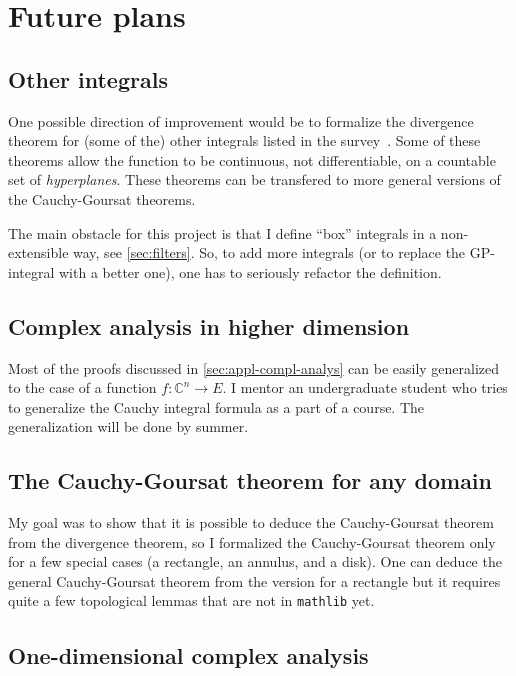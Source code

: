\documentclass[a4paper,UKenglish,cleveref, autoref, thm-restate]{lipics-v2021}
\newcommand{\bbC}{\mathbb{C}}
\begin{document}
\section{Future plans}\label{sec:future-plans}

\subsection{Other integrals}\label{sec:other-integrals}

One possible direction of improvement would be to formalize the
divergence theorem for (some of the) other integrals listed in the
survey~\cite{BONGIORNO2002587}. Some of these theorems allow the
function to be continuous, not differentiable, on a countable set of
\emph{hyperplanes}. These theorems can be transfered to more general
versions of the Cauchy-Goursat theorems.

The main obstacle for this project is that I define \enquote{box}
integrals in a non-extensible way, see \autoref{sec:filters}. So, to
add more integrals (or to replace the GP-integral with a better one),
one has to seriously refactor the definition.

\subsection{Complex analysis in higher dimension}%
\label{sec:compl-analys-high}

Most of the proofs discussed in \autoref{sec:appl-compl-analys} can be
easily generalized to the case of a function
\(f\colon \bbC^{n}\to E\). I mentor an undergraduate student who tries
to generalize the Cauchy integral formula as a part of a course. The
generalization will be done by summer.

\subsection{The Cauchy-Goursat theorem for any domain}\label{sec:cauchy-goursat-any}

My goal was to show that it is possible to deduce the Cauchy-Goursat
theorem from the divergence theorem, so I formalized the
Cauchy-Goursat theorem only for a few special cases (a rectangle, an
annulus, and a disk). One can deduce the general Cauchy-Goursat
theorem from the version for a rectangle but it requires quite a few
topological lemmas that are not in \texttt{mathlib} yet.

\subsection{One-dimensional complex analysis}%
\label{sec:one-dimens-compl}
\end{document}
